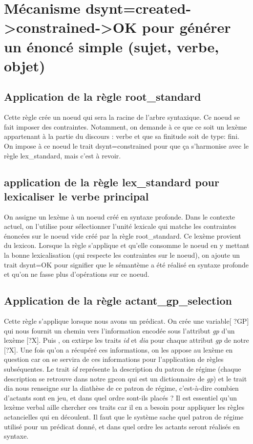 \section{Mécanisme dsynt=created->constrained->OK pour générer un énoncé simple (sujet, verbe, objet)}

\subsection{Application de la règle root{\_}standard}
Cette règle crée un noeud qui sera la racine de l'arbre syntaxique. Ce noeud se fait imposer des contraintes. Notamment, on demande à ce que ce soit un lexème appartenant à la partie du discours : verbe et que sa finitude soit de type: fini. On impose à ce noeud le trait dsynt=constrained pour que ça s'harmonise avec le règle lex{\_}standard, mais c'est à revoir.

\subsection{application de la règle lex{\_}standard pour lexicaliser le verbe principal}
On assigne un lexème à un noeud  créé en syntaxe profonde. Dans le contexte actuel, on l'utilise pour sélectionner l'unité lexicale qui matche les contraintes énoncées sur le noeud vide créé par la règle root{\_}standard. Ce lexème provient du lexicon. Lorsque la règle s'applique et qu'elle consomme le noeud en y mettant la bonne lexicalisation (qui respecte les contraintes sur le noeud), on ajoute un trait dsynt=OK pour signifier que le sémantème a été réalisé en syntaxe profonde et qu'on ne fasse plus d'opérations sur ce noeud.

\subsection{Application de la règle actant{\_}gp{\_}selection}
Cette règle s'applique lorsque nous avons un prédicat.
On crée une variable[ ?GP] qui nous fournit un chemin vers l'information encodée sous l'attribut \emph{ gp} d'un lexème [?X]. Puis , on extirpe les traits \emph{ id} et \emph{dia} pour chaque attribut\emph{ gp} de notre [?X]. Une fois qu'on a récupéré ces informations, on les appose au lexème en question car on se servira de ces informations pour l'application de règles subséquentes. Le trait \emph{ id} représente la description du patron de régime (chaque description se retrouve dans notre gpcon qui est un dictionnaire de\emph{ gp}) et le trait dia nous renseigne sur la diathèse de ce patron de régime, c'est-à-dire combien d'actants sont en jeu, et dans quel ordre sont-ils placés ? Il est essentiel qu'un lexème verbal aille chercher ces traits car il en a besoin pour appliquer les règles actancielles qui en découlent. Il faut que le système sache quel patron de régime utilisé pour un prédicat donné, et dans quel ordre les actants seront réalisés en syntaxe.

